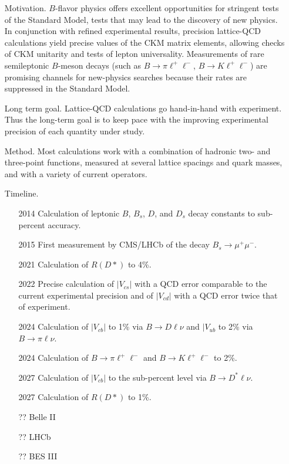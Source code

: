 \documentclass{article}
\begin{document}
\begin{itemize}
    \item[Motivation.] $B$-flavor physics offers excellent opportunities for stringent tests of the Standard Model, tests that may lead to the discovery of new physics. In conjunction with refined experimental results, precision lattice-QCD calculations yield precise values of the CKM matrix elements, allowing checks of CKM unitarity and tests of lepton universality. Measurements of rare semileptonic $B$-meson decays (such as $B\to\pi\ell^+\ell^-$, $B\to K\ell^+\ell^-$) are promising channels for new-physics searches because their rates are suppressed in the Standard Model.
    \item[Long term goal.] Lattice-QCD calculations go hand-in-hand with experiment.  Thus the long-term goal is to keep pace with the improving experimental precision of each quantity under study.
    \item[Method.] Most calculations work with a combination of hadronic two- and three-point functions, measured at several lattice spacings and quark masses, and with a variety of current operators. 
\item[Timeline.]
\begin{itemize}
    \item[2014] Calculation of leptonic $B$, $B_s$, $D$, and $D_s$ decay constants to sub-percent accuracy.
    \item[2015] First measurement by CMS/LHCb of the decay $B_s \to \mu^+\mu^-$.
    \item[2021] Calculation of $R(D*)$ to 4\%.
    \item[2022] Precise calculation of $|V_{cs}|$ with a QCD error comparable to the current experimental precision and of $|V_{cd}|$ with a QCD error twice that of experiment.
    \item[2024] Calculation of $|V_{cb}|$ to 1\% via $B\to D\ell\nu$ and $|V_{ub}$ to 2\% via $B\to \pi\ell\nu$.
    \item[2024] Calculation of $B\to\pi \ell^+\ell^-$ and $B\to K \ell^+\ell^-$ to 2\%.
    \item[2027] Calculation of $|V_{cb}|$ to the sub-percent level via $B\to D^*\ell\nu$.
    \item[2027] Calculation of $R(D*)$ to 1\%.
    \item[??] Belle II
    \item[??] LHCb
    \item[??] BES III
\end{itemize}
\end{itemize}
\end{document}
